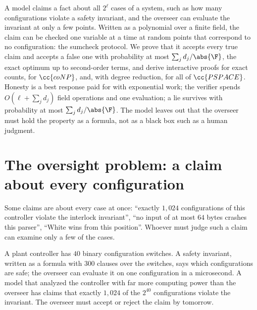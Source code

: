 \newcommand{\sumcheckL}{\mathrm{L}}
\newcommand{\sumcheckcount}{\#\mathrm{SAT}_{\mathrm{D}}}
\newcommand{\sumchecktqbf}{\mathrm{TQBF}}
\newcommand{\sumcheckunsat}{\mathrm{UNSAT}}
\newcommand{\sumchecksub}[2]{#1|_{#2}}

\begin{refsection}

\begin{chaptersummary}
A model claims a fact about all $2^\ell$ cases of a system, such as how many configurations violate a safety invariant, and the overseer can evaluate the invariant at only a few points. Written as a polynomial over a finite field, the claim can be checked one variable at a time at random points that correspond to no configuration: the sumcheck protocol. We prove that it accepts every true claim and accepts a false one with probability at most $\sum_jd_j/\abs{\F}$, the exact optimum up to second-order terms, and derive interactive proofs for exact counts, for $\cc{coNP}$, and, with degree reduction, for all of $\cc{PSPACE}$. Honesty is a best response paid for with exponential work; the verifier spends $O(\ell+\sum_jd_j)$ field operations and one evaluation; a lie survives with probability at most $\sum_jd_j/\abs{\F}$. The model leaves out that the overseer must hold the property as a formula, not as a black box such as a human judgment.
\end{chaptersummary}

\section{The oversight problem: a claim about every configuration}\label{sec:sumcheck:problem}

Some claims are about every case at once: ``exactly $1{,}024$ configurations of this controller violate the interlock invariant'', ``no input of at most $64$ bytes crashes this parser'', ``White wins from this position''. Whoever must judge such a claim can examine only a few of the cases.

\begin{oversight}
A plant controller has $40$ binary configuration switches. A safety invariant, written as a formula with $300$ clauses over the switches, says which configurations are safe; the overseer can evaluate it on one configuration in a microsecond. A model that analyzed the controller with far more computing power than the overseer has claims that exactly $1{,}024$ of the $2^{40}$ configurations violate the invariant. The overseer must accept or reject the claim by tomorrow.
\end{oversight}


\end{refsection}
